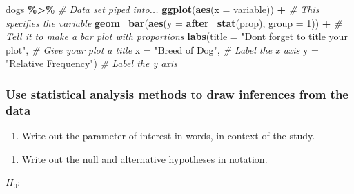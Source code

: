 \documentclass[
]{report}
\newenvironment{Shaded}{\begin{snugshade}}{\end{snugshade}}
\newcommand{\AttributeTok}[1]{\textcolor[rgb]{0.13,0.29,0.53}{#1}}
\newcommand{\CommentTok}[1]{\textcolor[rgb]{0.56,0.35,0.01}{\textit{#1}}}
\newcommand{\DecValTok}[1]{\textcolor[rgb]{0.00,0.00,0.81}{#1}}
\newcommand{\FunctionTok}[1]{\textcolor[rgb]{0.13,0.29,0.53}{\textbf{#1}}}
\newcommand{\NormalTok}[1]{#1}
\newcommand{\SpecialCharTok}[1]{\textcolor[rgb]{0.81,0.36,0.00}{\textbf{#1}}}
\newcommand{\StringTok}[1]{\textcolor[rgb]{0.31,0.60,0.02}{#1}}
\providecommand{\tightlist}{%
  \setlength{\itemsep}{0pt}\setlength{\parskip}{0pt}}
\begin{document}
\begin{Shaded}
\begin{Highlighting}[]
\NormalTok{dogs }\SpecialCharTok{\%\textgreater{}\%} \CommentTok{\# Data set piped into...}
    \FunctionTok{ggplot}\NormalTok{(}\FunctionTok{aes}\NormalTok{(}\AttributeTok{x =}\NormalTok{ variable)) }\SpecialCharTok{+}   \CommentTok{\# This specifies the variable}
    \FunctionTok{geom\_bar}\NormalTok{(}\FunctionTok{aes}\NormalTok{(}\AttributeTok{y =} \FunctionTok{after\_stat}\NormalTok{(prop), }\AttributeTok{group =} \DecValTok{1}\NormalTok{)) }\SpecialCharTok{+}  \CommentTok{\# Tell it to make a bar plot with proportions}
    \FunctionTok{labs}\NormalTok{(}\AttributeTok{title =} \StringTok{"Don\textquotesingle{}t forget to title your plot"}\NormalTok{,  }
       \CommentTok{\# Give your plot a title}
       \AttributeTok{x =} \StringTok{"Breed of Dog"}\NormalTok{,   }\CommentTok{\# Label the x axis}
       \AttributeTok{y =} \StringTok{"Relative Frequency"}\NormalTok{)  }\CommentTok{\# Label the y axis}
\end{Highlighting}
\end{Shaded}

\subsubsection*{Use statistical analysis methods to draw inferences from the data}\label{use-statistical-analysis-methods-to-draw-inferences-from-the-data-2}

\begin{enumerate}
\def\labelenumi{\arabic{enumi}.}
\setcounter{enumi}{2}
\tightlist
\item
  Write out the parameter of interest in words, in context of the study.
\end{enumerate}

\vspace{0.5in}

\newpage

\begin{enumerate}
\def\labelenumi{\arabic{enumi}.}
\setcounter{enumi}{3}
\tightlist
\item
  Write out the null and alternative hypotheses in notation.
\end{enumerate}

\vspace{1mm}

\(H_0:\)
\end{document}
